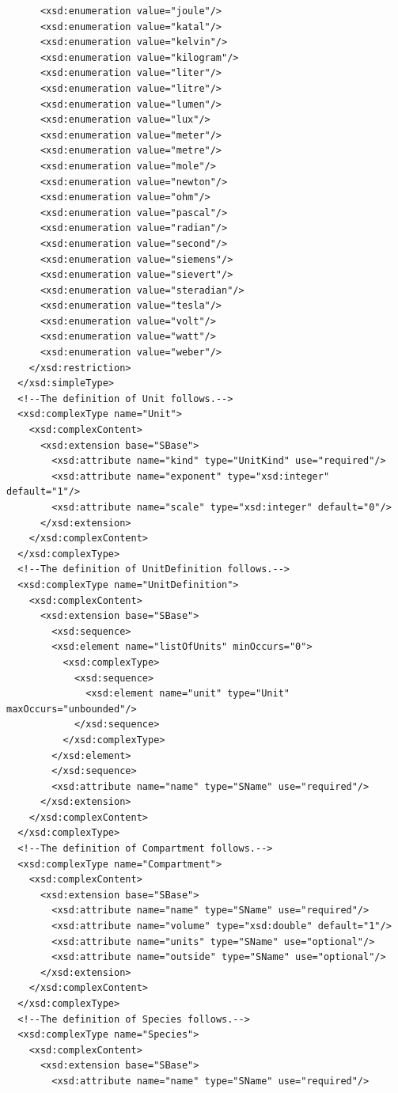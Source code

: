\documentclass[10pt]{cekarticle}
\begin{document}
\begin{small}
\begin{verbatim}
      <xsd:enumeration value="joule"/>
      <xsd:enumeration value="katal"/>
      <xsd:enumeration value="kelvin"/>
      <xsd:enumeration value="kilogram"/>
      <xsd:enumeration value="liter"/>
      <xsd:enumeration value="litre"/>
      <xsd:enumeration value="lumen"/>
      <xsd:enumeration value="lux"/>
      <xsd:enumeration value="meter"/>
      <xsd:enumeration value="metre"/>
      <xsd:enumeration value="mole"/>
      <xsd:enumeration value="newton"/>
      <xsd:enumeration value="ohm"/>
      <xsd:enumeration value="pascal"/>
      <xsd:enumeration value="radian"/>
      <xsd:enumeration value="second"/>
      <xsd:enumeration value="siemens"/>
      <xsd:enumeration value="sievert"/>
      <xsd:enumeration value="steradian"/>
      <xsd:enumeration value="tesla"/>
      <xsd:enumeration value="volt"/>
      <xsd:enumeration value="watt"/>
      <xsd:enumeration value="weber"/>
    </xsd:restriction>
  </xsd:simpleType>
  <!--The definition of Unit follows.-->
  <xsd:complexType name="Unit">
    <xsd:complexContent>
      <xsd:extension base="SBase">
      	<xsd:attribute name="kind" type="UnitKind" use="required"/>
      	<xsd:attribute name="exponent" type="xsd:integer" default="1"/>
      	<xsd:attribute name="scale" type="xsd:integer" default="0"/>
      </xsd:extension>
    </xsd:complexContent>
  </xsd:complexType>
  <!--The definition of UnitDefinition follows.-->
  <xsd:complexType name="UnitDefinition">
    <xsd:complexContent>
      <xsd:extension base="SBase">
      	<xsd:sequence>
        <xsd:element name="listOfUnits" minOccurs="0">
          <xsd:complexType>
            <xsd:sequence>
              <xsd:element name="unit" type="Unit" maxOccurs="unbounded"/>
            </xsd:sequence>
          </xsd:complexType>
        </xsd:element>
      	</xsd:sequence>
      	<xsd:attribute name="name" type="SName" use="required"/>
      </xsd:extension>
    </xsd:complexContent>
  </xsd:complexType>
  <!--The definition of Compartment follows.-->
  <xsd:complexType name="Compartment">
    <xsd:complexContent>
      <xsd:extension base="SBase">
      	<xsd:attribute name="name" type="SName" use="required"/>
      	<xsd:attribute name="volume" type="xsd:double" default="1"/>
      	<xsd:attribute name="units" type="SName" use="optional"/>
      	<xsd:attribute name="outside" type="SName" use="optional"/>
      </xsd:extension>
    </xsd:complexContent>
  </xsd:complexType>
  <!--The definition of Species follows.-->
  <xsd:complexType name="Species">
    <xsd:complexContent>
      <xsd:extension base="SBase">
      	<xsd:attribute name="name" type="SName" use="required"/>

\end{verbatim}
\end{small}
\end{document}
